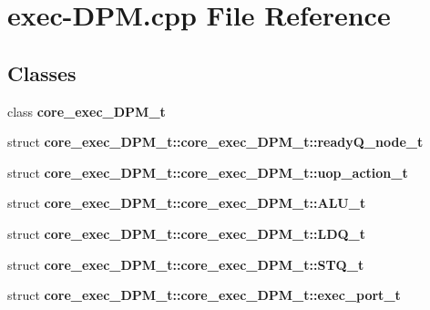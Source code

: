 \section{exec-DPM.cpp File Reference}
\label{exec-DPM_8cpp}
\subsection*{Classes}
\begin{CompactItemize}
\item 
class {\bf core\_\-exec\_\-DPM\_\-t}
\item 
struct {\bf core\_\-exec\_\-DPM\_\-t::core\_\-exec\_\-DPM\_\-t::readyQ\_\-node\_\-t}
\item 
struct {\bf core\_\-exec\_\-DPM\_\-t::core\_\-exec\_\-DPM\_\-t::uop\_\-action\_\-t}
\item 
struct {\bf core\_\-exec\_\-DPM\_\-t::core\_\-exec\_\-DPM\_\-t::ALU\_\-t}
\item 
struct {\bf core\_\-exec\_\-DPM\_\-t::core\_\-exec\_\-DPM\_\-t::LDQ\_\-t}
\item 
struct {\bf core\_\-exec\_\-DPM\_\-t::core\_\-exec\_\-DPM\_\-t::STQ\_\-t}
\item 
struct {\bf core\_\-exec\_\-DPM\_\-t::core\_\-exec\_\-DPM\_\-t::exec\_\-port\_\-t}
\end{CompactItemize}
